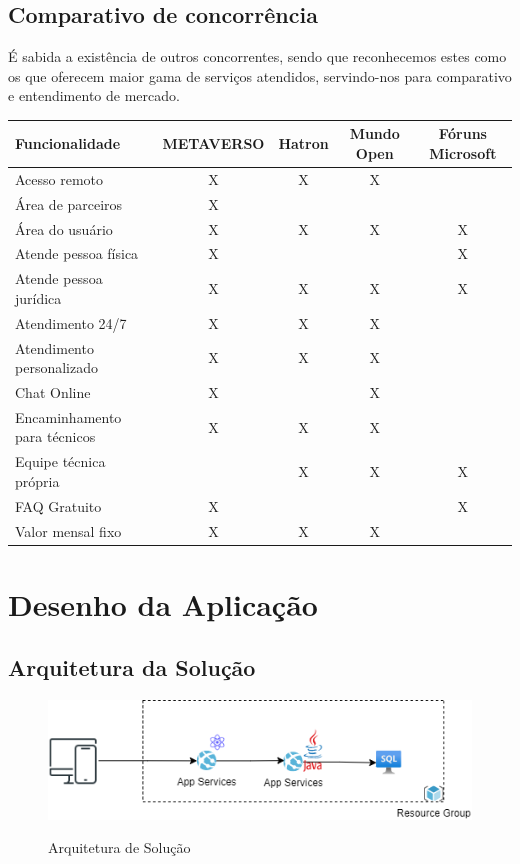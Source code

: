 \documentclass[
    12pt,               %
    openright,          %
    oneside,
    a4paper,            %
    MODELO,             %
    english,            %
    brazil              %
   ]{ifsp-spo-inf-ctds}
\begin{document}
    
    \section{Comparativo de concorrência}
    É sabida a existência de outros concorrentes, sendo que reconhecemos estes como os que oferecem maior gama de serviços atendidos, servindo-nos para comparativo e entendimento de mercado.
    
    \begin{table}
        \begin{tabular}{l c c c c}
            \hline
            Funcionalidade          & METAVERSO & Hatron & Mundo Open & Fóruns Microsoft \\
            \hline
            Acesso remoto           & X       & X   & X &   \\
            Área de parceiros   & X   &     &   &   \\
            Área do usuário & X & X & X & X\\
            Atende pessoa física & X &   &   & X\\
            Atende pessoa jurídica & X & X & X & X\\
            Atendimento 24/7 & X & X & X &  \\
            Atendimento personalizado & X & X & X &  \\
            Chat Online & X &   & X &  \\
            Encaminhamento para técnicos & X & X & X &  \\
            Equipe técnica própria &   & X & X & X\\
            FAQ Gratuito & X &   &   & X\\
            Valor mensal fixo & X & X & X &  \\
            \hline

        \end{tabular}
    \end{table}

\chapter[Desenho da Aplicação]{Desenho da Aplicação}

\section{Arquitetura da Solução}
\begin{figure}[h]
\caption{Arquitetura de Solução}

\centering %
\includegraphics[width=15cm]{anexos/arquitetura_v1.png} %
\label{figura:desenhodearquitetura}
\end{figure}
\end{document}
